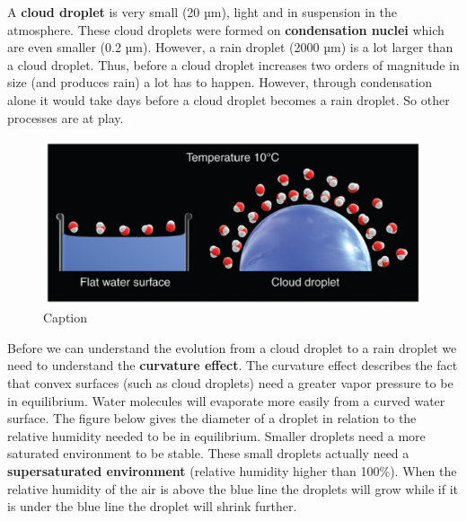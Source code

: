 \documentclass[12pt,oneside]{book}
\begin{document}
A \textbf{cloud droplet} is very small (20 µm), light and in suspension
in the atmosphere. These cloud droplets were formed on
\textbf{condensation nuclei} which are even smaller (0.2 µm). However, a
rain droplet (2000 µm) is a lot larger than a cloud droplet. Thus,
before a cloud droplet increases two orders of magnitude in size (and
produces rain) a lot has to happen. However, through condensation alone
it would take days before a cloud droplet becomes a rain droplet. So
other processes are at play.

\begin{figure}

{\centering \includegraphics[width=0.9\linewidth]{figures/Figure324} 

}

\caption{Caption}\label{fig:clouddroplet}
\end{figure}

Before we can understand the evolution from a cloud droplet to a rain
droplet we need to understand the \textbf{curvature effect}. The
curvature effect describes the fact that convex surfaces (such as cloud
droplets) need a greater vapor pressure to be in equilibrium. Water
molecules will evaporate more easily from a curved water surface. The
figure below gives the diameter of a droplet in relation to the relative
humidity needed to be in equilibrium. Smaller droplets need a more
saturated environment to be stable. These small droplets actually need a
\textbf{supersaturated environment} (relative humidity higher than
100\%). When the relative humidity of the air is above the blue line the
droplets will grow while if it is under the blue line the droplet will
shrink further.
\end{document}
